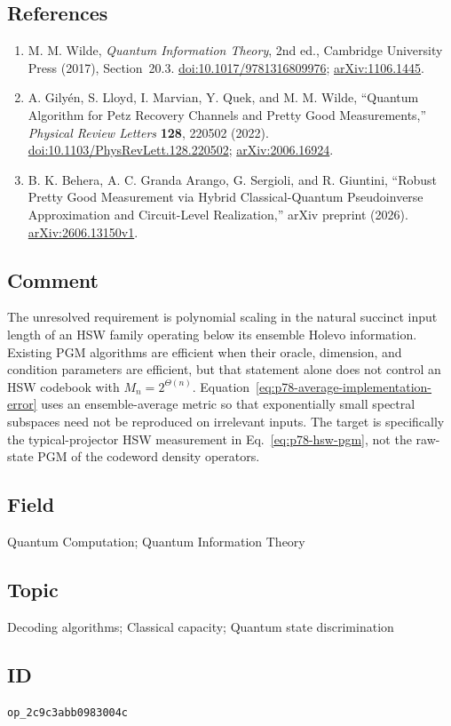 \subsection*{References}

\begin{enumerate}[label={},leftmargin=4.8em,labelsep=0.5em]
  \footnotesize
  \item[\textup{[Wil17]}]\label{ref:p78-wilde}
  M. M. Wilde, \emph{Quantum Information Theory}, 2nd ed., Cambridge
  University Press (2017), Section~20.3.
  \href{https://doi.org/10.1017/9781316809976}{doi:10.1017/9781316809976};
  \href{https://arxiv.org/abs/1106.1445}{arXiv:1106.1445}.

  \item[\textup{[GLM+22]}]\label{ref:p78-gilyen-et-al}
  A. Gily\'en, S. Lloyd, I. Marvian, Y. Quek, and M. M. Wilde,
  ``Quantum Algorithm for Petz Recovery Channels and Pretty Good
  Measurements,'' \emph{Physical Review Letters}
  \textbf{128}, 220502 (2022).
  \href{https://doi.org/10.1103/PhysRevLett.128.220502}{doi:10.1103/PhysRevLett.128.220502};
  \href{https://arxiv.org/abs/2006.16924}{arXiv:2006.16924}.

  \item[\textup{[BGS+26]}]\label{ref:p78-behera-et-al}
  B. K. Behera, A. C. Granda Arango, G. Sergioli, and R. Giuntini,
  ``Robust Pretty Good Measurement via Hybrid Classical-Quantum
  Pseudoinverse Approximation and Circuit-Level Realization,'' arXiv preprint
  (2026).
  \href{https://arxiv.org/abs/2606.13150v1}{arXiv:2606.13150v1}.
\end{enumerate}

\subsection*{Comment}

The unresolved requirement is polynomial scaling in the natural succinct
input length of an HSW family operating below its ensemble Holevo information.
Existing PGM algorithms are
efficient when their oracle, dimension, and condition parameters are
efficient, but that statement alone does not control an HSW codebook with
$M_n=2^{\Theta(n)}$.  Equation~\eqref{eq:p78-average-implementation-error}
uses an ensemble-average metric so that exponentially small spectral
subspaces need not be reproduced on irrelevant inputs.  The target is
specifically the typical-projector HSW measurement in
Eq.~\eqref{eq:p78-hsw-pgm}, not the raw-state PGM of the codeword density
operators.

\subsection*{Field}

Quantum Computation; Quantum Information Theory

\subsection*{Topic}

Decoding algorithms; Classical capacity; Quantum state discrimination

\subsection*{ID}

\texttt{op\_2c9c3abb0983004c}
